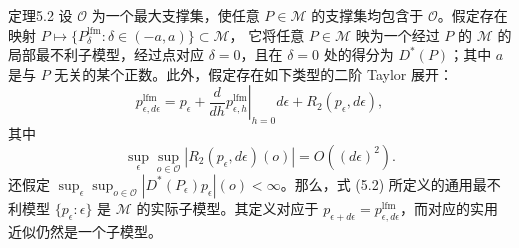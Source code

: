 \begin{bookresult}{定理}{5.2}
设 $\mathcal O$ 为一个最大支撑集，使任意 $P\in\mathcal M$ 的支撑集均包含于 $\mathcal O$。假定存在映射
$P\mapsto\{P_\delta^{\mathrm{lfm}}:\delta\in(-a,a)\}\subset\mathcal M$，
它将任意 $P\in\mathcal M$ 映为一个经过 $P$ 的 $\mathcal M$ 的局部最不利子模型，经过点对应 $\delta=0$，且在 $\delta=0$ 处的得分为 $D^*(P)$；其中 $a$ 是与 $P$ 无关的某个正数。此外，假定存在如下类型的二阶 Taylor 展开：
\[
 p_{\epsilon,d\epsilon}^{\mathrm{lfm}}
 =p_\epsilon+
 \left.\frac{d}{dh}p_{\epsilon,h}^{\mathrm{lfm}}\right|_{h=0}
 d\epsilon+R_2(p_\epsilon,d\epsilon),
\]
其中
\[
 \sup_\epsilon\sup_{o\in\mathcal O}
 |R_2(p_\epsilon,d\epsilon)(o)|=O((d\epsilon)^2).
\]
还假定 $\sup_\epsilon\sup_{o\in\mathcal O}|D^*(P_\epsilon)p_\epsilon|(o)<\infty$。那么，式 (5.2) 所定义的通用最不利模型 $\{p_\epsilon:\epsilon\}$ 是 $\mathcal M$ 的实际子模型。其定义对应于 $p_{\epsilon+d\epsilon}=p_{\epsilon,d\epsilon}^{\mathrm{lfm}}$，而对应的实用近似仍然是一个子模型。
\end{bookresult}
